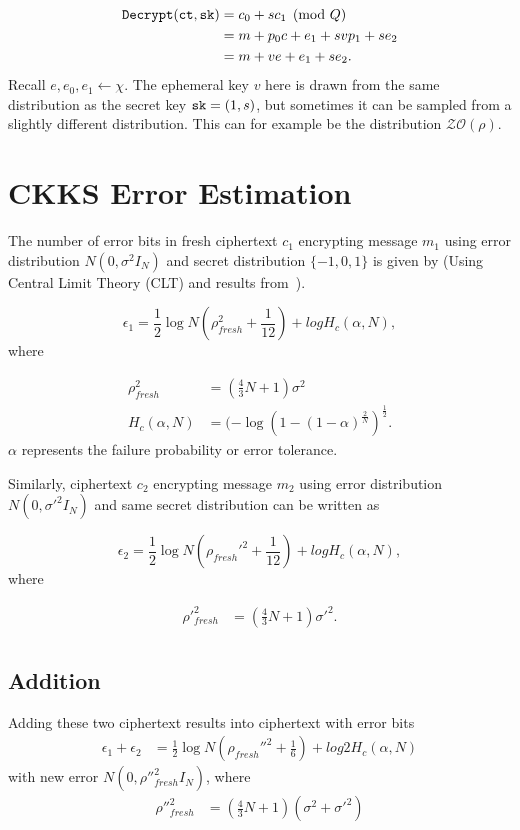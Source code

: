 \documentclass[a4paper,10pt]{article}
\begin{document}
\begin{align*}
	\texttt{Decrypt}(\texttt{ct}, \texttt{sk}) & = c_0 + sc_1 \pmod{Q} \\
						   & = m + p_0c + e_1 + svp_1 + se_2 \\
						   & = m + ve + e_1 + se_2.
\end{align*}
Recall $e, e_0, e_1 \leftarrow \chi$. 
The ephemeral key $v$ here is drawn from the same distribution as 
the secret key $\texttt{sk} = (1, s)$, but sometimes it can be sampled from a slightly different 
distribution. This can for example be the distribution $\mathcal{ZO}(\rho)$.


\section{CKKS Error Estimation}
The number of error bits in fresh ciphertext $c_1$ encrypting message $m_1$ using error 
distribution $N(0,\sigma^2 I_N)$ and secret distribution $\{-1,0,1\}$ is given by (Using Central Limit 
Theory (CLT) and results from~\cite{CCHMOP22}).

\begin{equation}
 \epsilon_1 = \frac{1}{2}\log N(\rho_{fresh}^2+\frac{1}{12}) + log H_c (\alpha,N),
\end{equation}
where

\begin{align*}
    \rho^2_{fresh}&=(\frac{4}{3}N+1)\sigma^2 \\
    H_c (\alpha,N)&=(-\log (1-(1-\alpha)^\frac{2}{N})^\frac{1}{2}.
\end{align*}
$\alpha$  represents the failure probability or error tolerance.

Similarly, ciphertext $c_2$ encrypting message $m_2$ using error distribution $N(0,\sigma'^2 I_N)$ 
and same secret distribution can be written as

\begin{equation}
 \epsilon_2 = \frac{1}{2}\log N(\rho_{fresh}'^2+\frac{1}{12}) + log H_c (\alpha,N),
\end{equation}
where

\begin{align*}
    \rho'^2_{fresh}&=(\frac{4}{3}N+1)\sigma'^2. \\
\end{align*}

\subsection{Addition} 
Adding these two ciphertext results into ciphertext with error bits
\begin{align}
  \epsilon_1+\epsilon_2 &= \frac{1}{2}\log N(\rho_{fresh}''^2+\frac{1}{6}) + log 2H_c (\alpha,N)
\end{align}
with new error $N(0,\rho''^2_{fresh}I_N)$, where
\begin{align*}
    \rho''^2_{fresh}&=(\frac{4}{3}N+1)(\sigma^2+\sigma'^2) \\
\end{align*}
\end{document}
